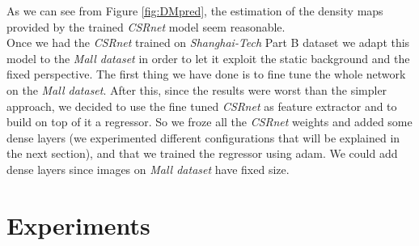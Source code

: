\documentclass[10pt,twocolumn,letterpaper]{article}
\begin{document}
As we can see from Figure \ref{fig:DMpred}, the estimation of the density maps provided by the trained \textit{CSRnet} model seem reasonable.
\\
Once we had the \textit{CSRnet} trained on \textit{Shanghai-Tech} Part B dataset we adapt this model to the \textit{Mall dataset} in order to let it exploit the static background and the fixed perspective. The first thing we have done is to fine tune the whole network on the \textit{Mall dataset}. After this, since the results were worst than the simpler approach, we decided to use the fine tuned \textit{CSRnet} as feature extractor and to build on top of it a regressor. So we froze all the \textit{CSRnet} weights and added some dense layers (we experimented different configurations that will be explained in the next section), and that we trained the regressor using adam. We could add dense layers since images on \textit{Mall dataset} have fixed size. 
\section{Experiments}


\printbibliography

%
%
\end{document}
